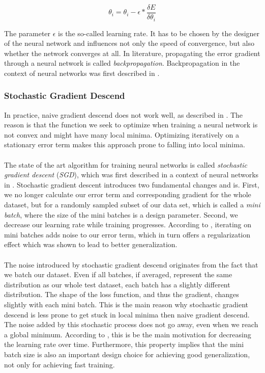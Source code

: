 \[
	\theta_i = \theta_i - \epsilon * \frac{\delta E}{\delta \theta_i}
\]

The parameter $\epsilon$ is the so-called learning rate. It has to be chosen by the designer of the neural network and influences not only the speed of convergence, but also whether the network converges at all. In literature, propagating the error gradient through a neural network is called \textit{backpropagation}. Backpropagation in the context of neural networks was first described in \cite{werbos1974beyond}.

\subsubsection{Stochastic Gradient Descend}

In practice, naive gradient descend does not work well, as described in \cite{wilson2003general}. The reason is that the function we seek to optimize when training a neural network is not convex and might have many local minima. Optimizing iteratively on a stationary error term makes this approach prone to falling into local minima. \\ \\
The state of the art algorithm for training neural networks is called \textit{stochastic gradient descent} (\textit{SGD}), which was first described in a context of neural networks in \cite{bottou1991stochastic}. Stochastic gradient descent introduces two fundamental changes and is. First, we no longer calculate our error term and corresponding gradient for the whole dataset, but for a randomly sampled subset of our data set, which is called a \textit{mini batch}, where the size of the mini batches is a design parameter. Second, we decrease our learning rate while training progresses. According to \cite{Goodfellow-et-al-2016}, iterating on mini batches adds noise to our error term, which in turn offers a regularization effect which was shown to lead to better generalization.
\\ \\
The noise introduced by stochastic gradient descend originates from the fact that we batch our dataset. Even if all batches, if averaged, represent the same distribution as our whole test dataset, each batch has a slightly different distribution. The shape of the loss function, and thus the gradient, changes slightly with each mini batch. This is the main reason why stochastic gradient descend is less prone to get stuck in local minima then naive gradient descend. The noise added by this stochastic process does not go away, even when we reach a global minimum. According to \cite{Goodfellow-et-al-2016}, this is be the main motivation for decreasing the learning rate over time. Furthermore, this property implies that the mini batch size is also an important design choice for achieving good generalization, not only for achieving fast training. 
